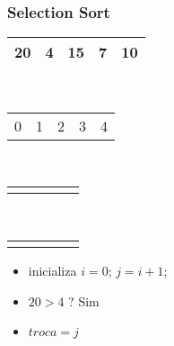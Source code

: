 \documentclass{beamer}
\begin{document}
\begin{frame}
    \frametitle{Selection Sort}
    \begin{center}
        \begin{table}
            \begin{tabular}{| p{0.25cm} | p{0.25cm} | p{0.25cm} | p{0.25cm} | p{0.25cm} |}
                \hline
                20 & 4 & 15 & 7 & 10 \\ \hline
            \end{tabular} \\
            \begin{tabular}{p{0.25cm} p{0.25cm} p{0.25cm} p{0.25cm} p{0.25cm}}
                0 & 1 & 2 & 3 & 4
            \end{tabular} \\
            \begin{tabular}{p{0.25cm} p{0.25cm} p{0.25cm} p{0.25cm} p{0.25cm}}
                \color{blue}{$\uparrow$} & \color{red}{$\uparrow$} & & &
            \end{tabular} \\
            \begin{tabular}{p{0.25cm} p{0.25cm} p{0.25cm} p{0.25cm} p{0.25cm}}
                \color{blue}{i} & \color{red}{j} & & &
            \end{tabular}
        \end{table}
	\end{center}
    \color{green}{$troca = 0$}
    \begin{itemize}[<+->]
        \item inicializa $i = 0$; $j = i + 1$;
        \item $20 > 4$ ? Sim
        \item $troca = j$
    \end{itemize}
\end{frame}
\end{document}
